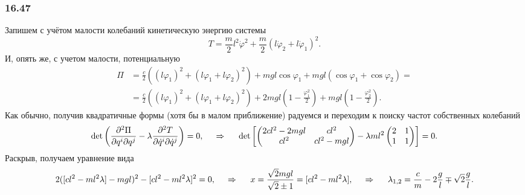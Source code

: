 \subsubsection*{16.47}

Запишем с учётом малости колебаний кинетическую энергию системы
\begin{equation*}
    T = \frac{m}{2} l^2 \dot{\varphi}^2 + \frac{m}{2} \left(
        l \dot{\varphi}_2 + l \dot{\varphi}_1
    \right)^2.
\end{equation*}
И, опять же, с учетом малости, потенциальную
\begin{align*}
    \Pi &= \frac{c}{2} \left(
        (l \varphi_1)^2 + (l \varphi_1 + l \varphi_2)^2
    \right) + 
    m g l \cos \varphi_1 + m  g l (\cos \varphi_1 + \cos \varphi_2) = \\
    &= 
    \frac{c}{2} \left(
        (l \varphi_1)^2 + (l \varphi_1 + l \varphi_2)^2
    \right) + 2 m g l \left(1 - \frac{\varphi_1^2}{2}\right) + mgl \left(1 - \frac{\varphi_2^2}{2}\right).
\end{align*}
Как обычно, получив квадратичные формы (хотя бы в малом приближение) радуемся и переходим к поиску частот собственных колебаний
\begin{equation*}
     \det \left(
     \frac{\partial^2 \Pi}{\partial q^i \partial q^j} - \lambda \frac{\partial^2 T}{\partial \dot{q}^i \partial \dot{q}^j}\right) = 0,
     \hspace{0.5cm} \Rightarrow \hspace{0.5cm}
     \det\left[
        \begin{pmatrix}
            2cl^2 - 2 mgl & c l^2 \\
            c l^2 & cl^2  - mgl \\
        \end{pmatrix} - 
        \lambda 
        ml^2\begin{pmatrix}
            2 & 1 \\
            1 & 1 \\
        \end{pmatrix}
     \right] = 0.
\end{equation*}
Раскрыв, получаем уравнение вида
\begin{equation*}
    2 ([cl^2-ml^2 \lambda] - mgl)^2 - [cl^2-ml^2 \lambda]^2 = 0,
    \hspace{0.5cm} \Rightarrow \hspace{0.5cm}
    x = \frac{\sqrt{2} m g l}{\sqrt{2} \pm 1} = [cl^2-ml^2 \lambda],
    \hspace{0.5cm} \Rightarrow \hspace{0.5cm}
    \lambda_{1, 2} = \frac{c}{m} -  2\frac{g}{l} \mp \sqrt{2} \frac{g}{l}.
\end{equation*}
